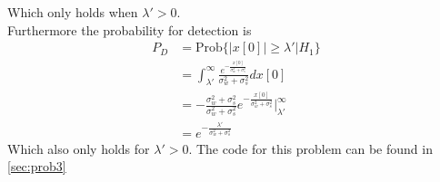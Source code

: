 Which only holds when $\lambda'>0$.\\
Furthermore the probability for detection is
\begin{align}
    P_D & = \text{Prob}\{|x[0]|\geq\lambda'\big\vert H_1\}\nonumber\\
    & = \int_{\lambda'}^{\infty}\frac{e^{-\frac{x[0]}{\sigma_w^2+\sigma_s^2}}}{\sigma_w^2+\sigma_s^2}dx[0]\nonumber\\
    & = -\frac{\sigma_w^2+\sigma_s^2}{\sigma_w^2+\sigma_s^2}e^{-\frac{x[0]}{\sigma_w^2+\sigma_s^2}}\bigg\rvert_{\lambda'}^{\infty}\nonumber\\
    & = e^{-\frac{\lambda'}{\sigma_w^2+\sigma_s^2}}\nonumber
\end{align}
Which also only holds for $\lambda'>0$. The code for this problem can be found in \ref{sec:prob3}\\

